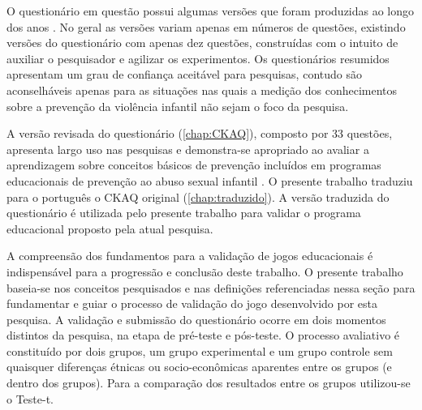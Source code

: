 \vspace{-0.1cm}

O questionário em questão possui algumas versões que foram produzidas ao longo dos anos \cite{tutty1995revised, tutty2019children}. No geral as versões variam apenas em números de questões, existindo versões do questionário com apenas dez questões, construídas com o intuito de auxiliar o pesquisador e agilizar os experimentos. Os questionários resumidos apresentam um grau de confiança aceitável para pesquisas, contudo são aconselháveis apenas para as situações nas quais a medição dos conhecimentos sobre a prevenção da violência infantil não sejam o foco da pesquisa. 



\vspace{-0.1cm}

A versão revisada do questionário (\autoref{chap:CKAQ}), composto por 33 questões, apresenta largo uso nas pesquisas e demonstra-se apropriado ao avaliar a aprendizagem sobre conceitos básicos de prevenção incluídos em programas educacionais de prevenção ao abuso sexual infantil \cite{tutty1992ability}. O presente trabalho traduziu para o português o CKAQ original (\autoref{chap:traduzido}). A versão traduzida do questionário é utilizada pelo presente trabalho para validar o programa educacional proposto pela atual pesquisa.%




\vspace{-0.1cm}

A compreensão dos fundamentos para a validação de jogos educacionais é indispensável para a progressão e conclusão deste trabalho. O presente trabalho baseia-se nos conceitos pesquisados e nas definições referenciadas nessa seção para fundamentar e guiar o processo de validação do jogo desenvolvido por esta pesquisa. A validação e submissão do questionário ocorre em dois momentos distintos da pesquisa, na etapa de pré-teste e pós-teste. O processo avaliativo é constituído por dois grupos, um grupo experimental e um grupo controle sem quaisquer diferenças étnicas ou socio-econômicas aparentes entre os grupos (e dentro dos grupos). Para a comparação dos resultados entre os grupos utilizou-se o Teste-t. 

